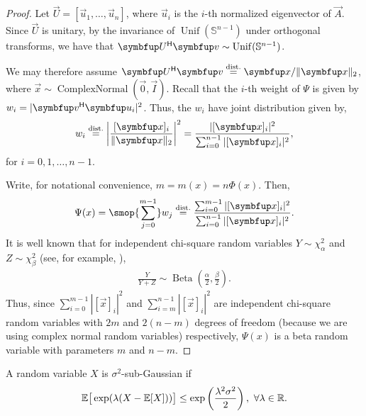 \begin{proof}
    Let \( \vec{U} = [\vec{u}_1, \ldots, \vec{u}_n] \), where \( \vec{u}_i \) is the \( i \)-th normalized eigenvector of \( \vec{A} \).
    Since \( \vec{U} \) is unitary, by the invariance of \( \operatorname{Unif}(\mathbb{S}^{n-1}) \) under orthogonal transforms, we have that \( \vec{U}^\cT \vec{v} \sim \operatorname{Unif}(\mathbb{S}^{n-1}) \).
    
    We may therefore assume \( \vec{U}^\cT\vec{v} \stackrel{\textup{dist.}}{=} \vec{x} / \| \vec{x} \|_2 \), where \( \vec{x} \sim \operatorname{ComplexNormal}(\vec{0},\vec{I}) \). %
    Recall that the \( i \)-th weight of \( \Psi \) is given by \( w_i = |\vec{v}^\cT \vec{u}_i|^2 \).
    Thus, the \( w_i \) have joint distribution given by, 
\begin{align*}
    w_i 
    \stackrel{\textup{dist.}}{=} 
    \left|\frac{[\vec{x}]_i}{\|\vec{x}\|_2} \right|^2 
    = \frac{|[\vec{x}]_i|^2}{\sum_{i=0}^{n-1}|[\vec{x}]_i|^2},
\end{align*}
for \( i=0,1,\ldots, n-1 \).

Write, for notational convenience, \( m = m(x) = n \Phi(x) \).
Then, 
\begin{align*}
    \Psi(x)
    = \smop{\sum_{j=0}^{m-1}} w_j
    \stackrel{\textup{dist.}}{=}
    \frac{\sum_{i=0}^{m-1} |[\vec{x}]_i|^2}{\sum_{i=0}^{n-1} |[\vec{x}]_i|^2}.
\end{align*}    
    It is well known that for independent chi-square random variables \( Y \sim \chi_{\alpha}^2 \) and \( Z \sim \chi_{\beta}^2 \) (see, for example, \cite[Section 25.2]{johnson_kotz_balakrishnan_94}),
\begin{align*}
    \frac{Y}{Y+Z}\sim \operatorname{Beta} \left( \frac{\alpha}{2}, \frac{\beta}{2} \right).
\end{align*}
    Thus, since \( \sum_{i=0}^{m-1} |[\vec{x}]_i|^2 \) and \( \sum_{i=m}^{n-1} |[\vec{x}]_i|^2 \) are independent chi-square random variables with \( 2m \) and \( 2(n-m) \) degrees of freedom (because we are using complex normal random variables) respectively, \( \Psi(x) \) is a beta random variable with parameters \( m \) and \( n-m \).
\end{proof}

\begin{definition}
A random variable \( X \) is \( \sigma^2\)-sub-Gaussian if %
\begin{align*}
    \mathbb{E}\big[ \exp(\lambda (X - \mathbb{E}[X]))\big]
    \leq \exp \left( \frac{\lambda^2 \sigma^2}{2} \right)
    ,~\forall \lambda \in \mathbb{R}.
\end{align*}
\end{definition}

